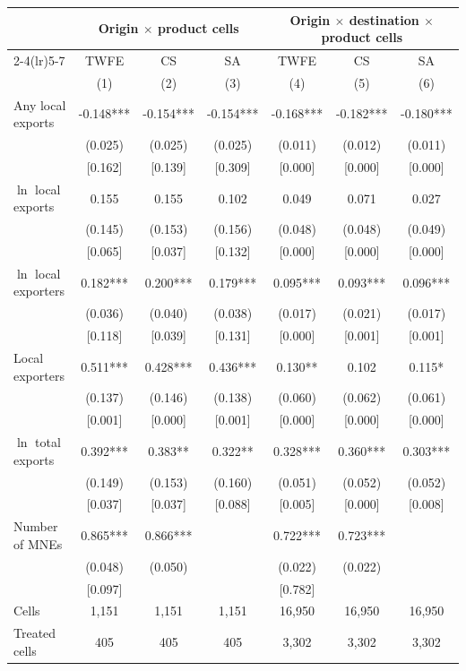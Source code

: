 \begin{tabular}{l*{6}{c}}
\toprule
 & \multicolumn{3}{c}{Origin $\times$ product cells} & \multicolumn{3}{c}{Origin $\times$ destination $\times$ product cells} \\
\cmidrule(lr){2-4}\cmidrule(lr){5-7}
 & TWFE & CS & SA & TWFE & CS & SA \\
 & (1) & (2) & (3) & (4) & (5) & (6) \\
\midrule
Any local exports & -0.148*** & -0.154*** & -0.154*** & -0.168*** & -0.182*** & -0.180*** \\
 & (0.025) & (0.025) & (0.025) & (0.011) & (0.012) & (0.011) \\
 & [0.162] & [0.139] & [0.309] & [0.000] & [0.000] & [0.000] \\
$\ln$ local exports & 0.155 & 0.155 & 0.102 & 0.049 & 0.071 & 0.027 \\
 & (0.145) & (0.153) & (0.156) & (0.048) & (0.048) & (0.049) \\
 & [0.065] & [0.037] & [0.132] & [0.000] & [0.000] & [0.000] \\
$\ln$ local exporters & 0.182*** & 0.200*** & 0.179*** & 0.095*** & 0.093*** & 0.096*** \\
 & (0.036) & (0.040) & (0.038) & (0.017) & (0.021) & (0.017) \\
 & [0.118] & [0.039] & [0.131] & [0.000] & [0.001] & [0.001] \\
Local exporters & 0.511*** & 0.428*** & 0.436*** & 0.130** & 0.102 & 0.115* \\
 & (0.137) & (0.146) & (0.138) & (0.060) & (0.062) & (0.061) \\
 & [0.001] & [0.000] & [0.001] & [0.000] & [0.000] & [0.000] \\
$\ln$ total exports & 0.392*** & 0.383** & 0.322** & 0.328*** & 0.360*** & 0.303*** \\
 & (0.149) & (0.153) & (0.160) & (0.051) & (0.052) & (0.052) \\
 & [0.037] & [0.037] & [0.088] & [0.005] & [0.000] & [0.008] \\
Number of MNEs & 0.865*** & 0.866*** &  & 0.722*** & 0.723*** &  \\
 & (0.048) & (0.050) &  & (0.022) & (0.022) &  \\
 & [0.097] &  &  & [0.782] &  &  \\
\midrule
Cells & 1,151 & 1,151 & 1,151 & 16,950 & 16,950 & 16,950 \\
Treated cells & 405 & 405 & 405 & 3,302 & 3,302 & 3,302 \\
\bottomrule
\end{tabular}
